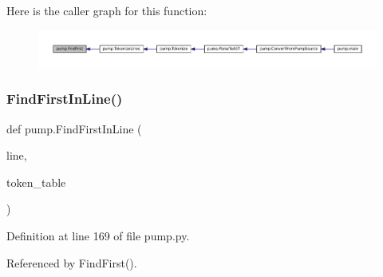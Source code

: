 Here is the caller graph for this function\+:
\nopagebreak
\begin{figure}[H]
\begin{center}
\leavevmode
\includegraphics[width=350pt]{namespacepump_a08f2d05c192d11a134c008287bafef07_icgraph}
\end{center}
\end{figure}
\mbox{\label{namespacepump_af9f92ec64fe45399c7e051115a107ee7}} 
\subsubsection{\texorpdfstring{Find\+First\+In\+Line()}{FindFirstInLine()}}
{\footnotesize\ttfamily def pump.\+Find\+First\+In\+Line (\begin{DoxyParamCaption}\item[{}]{line,  }\item[{}]{token\+\_\+table }\end{DoxyParamCaption})}



Definition at line 169 of file pump.\+py.



Referenced by Find\+First().


